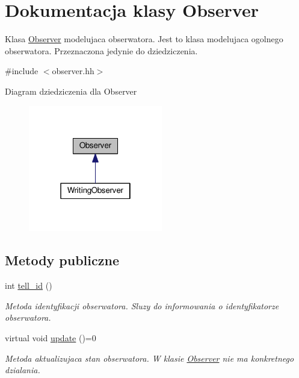 \hypertarget{class_observer}{\section{Dokumentacja klasy Observer}
\label{class_observer}
}


Klasa \hyperlink{class_observer}{Observer} modelujaca obserwatora. Jest to klasa modelujaca ogolnego obserwatora. Przeznaczona jedynie do dziedziczenia.  




{\ttfamily \#include $<$observer.\-hh$>$}



Diagram dziedziczenia dla Observer\nopagebreak
\begin{figure}[H]
\begin{center}
\leavevmode
\includegraphics[width=166pt]{class_observer__inherit__graph}
\end{center}
\end{figure}
\subsection*{Metody publiczne}
\begin{DoxyCompactItemize}
\item 
int \hyperlink{class_observer_a46f35957f410c0390ccfd03440b5b558}{tell\-\_\-id} ()
\begin{DoxyCompactList}\small\item\em Metoda identyfikacji obserwatora. Sluzy do informowania o identyfikatorze obserwatora. \end{DoxyCompactList}\item 
virtual void \hyperlink{class_observer_ac75e4b339faeb3ea6fe0a01bf0b4a215}{update} ()=0
\begin{DoxyCompactList}\small\item\em Metoda aktualizujaca stan obserwatora. W klasie \hyperlink{class_observer}{Observer} nie ma konkretnego dzialania. \end{DoxyCompactList}\end{DoxyCompactItemize}
